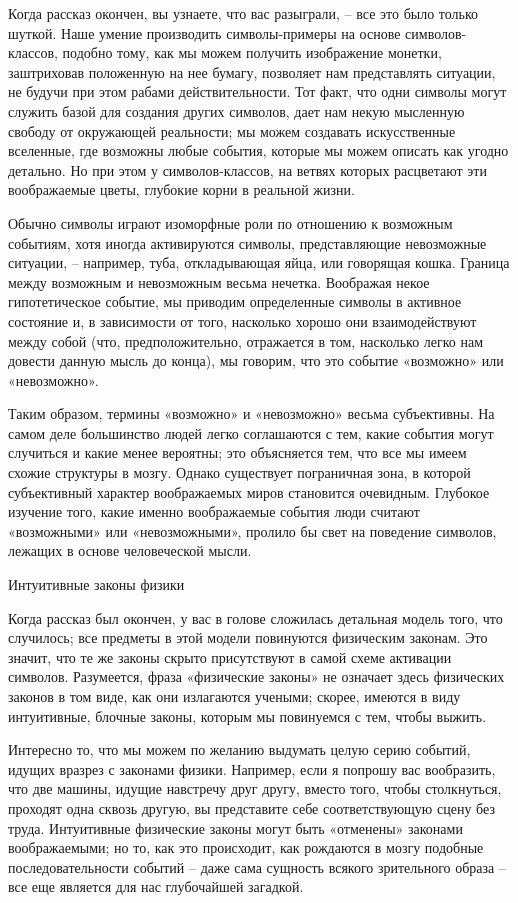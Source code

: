 \documentclass[../main.tex]{subfiles}
\begin{document}
Когда рассказ окончен, вы узнаете, что вас разыграли, \--- все это было только шуткой. Наше умение производить символы-примеры на основе символов-классов, подобно тому, как мы можем получить изображение монетки, заштриховав положенную на нее бумагу, позволяет нам представлять ситуации, не будучи при этом рабами действительности. Тот факт, что одни символы могут служить базой для создания других символов, дает нам некую мысленную свободу от окружающей реальности; мы можем создавать искусственные вселенные, где возможны любые события, которые мы можем описать как угодно детально. Но при этом у символов-классов, на ветвях которых расцветают эти воображаемые цветы, глубокие корни в реальной жизни.

Обычно символы играют изоморфные роли по отношению к возможным событиям, хотя иногда активируются символы, представляющие невозможные ситуации, \--- например, туба, откладывающая яйца, или говорящая кошка. Граница между возможным и невозможным весьма нечетка. Воображая некое гипотетическое событие, мы приводим определенные символы в активное состояние и, в зависимости от того, насколько хорошо они взаимодействуют между собой (что, предположительно, отражается в том, насколько легко нам довести данную мысль до конца), мы говорим, что это событие «возможно» или «невозможно».

Таким образом, термины «возможно» и «невозможно» весьма субъективны. На самом деле большинство людей легко соглашаются с тем, какие события могут случиться и какие менее вероятны; это объясняется тем, что все мы имеем схожие структуры в мозгу. Однако существует пограничная зона, в которой субъективный характер воображаемых миров становится очевидным. Глубокое изучение того, какие именно воображаемые события люди считают «возможными» или «невозможными», пролило бы свет на поведение символов, лежащих в основе человеческой мысли.

Интуитивные законы физики

Когда рассказ был окончен, у вас в голове сложилась детальная модель того, что случилось; все предметы в этой модели повинуются физическим законам. Это значит, что те же законы скрыто присутствуют в самой схеме активации символов. Разумеется, фраза «физические законы» не означает здесь физических законов в том виде, как они излагаются учеными; скорее, имеются в виду интуитивные, блочные законы, которым мы повинуемся с тем, чтобы выжить.

Интересно то, что мы можем по желанию выдумать целую серию событий, идущих вразрез с законами физики. Например, если я попрошу вас вообразить, что две машины, идущие навстречу друг другу, вместо того, чтобы столкнуться, проходят одна сквозь другую, вы представите себе соответствующую сцену без труда. Интуитивные физические законы могут быть «отменены» законами воображаемыми; но то, как это происходит, как рождаются в мозгу подобные последовательности событий \--- даже сама сущность всякого зрительного образа \--- все еще является для нас глубочайшей загадкой.
\end{document}
